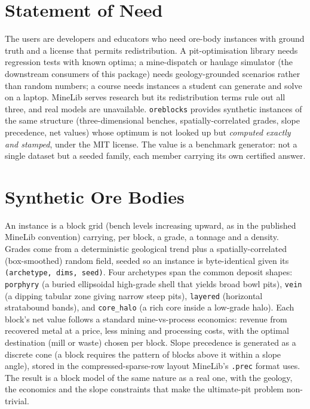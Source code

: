 \documentclass[journal]{IEEEtran}
\begin{document}
\section{Statement of Need}\label{sec:need}

The users are developers and educators who need ore-body instances with ground truth and a license that permits
redistribution. A pit-optimisation library needs regression tests with known optima; a mine-dispatch or haulage
simulator (the downstream consumers of this package) needs geology-grounded scenarios rather than random
numbers; a course needs instances a student can generate and solve on a laptop. MineLib serves research but its
redistribution terms rule out all three, and real models are unavailable. \texttt{oreblocks} provides synthetic
instances of the same structure (three-dimensional benches, spatially-correlated grades, slope precedence, net
values) whose optimum is not looked up but \emph{computed exactly and stamped}, under the MIT license. The value
is a benchmark generator: not a single dataset but a seeded family, each member carrying its own certified
answer.

\section{Synthetic Ore Bodies}\label{sec:deposits}

An instance is a block grid (bench levels increasing upward, as in the published MineLib convention) carrying,
per block, a grade, a tonnage and a density. Grades come from a deterministic geological trend plus a
spatially-correlated (box-smoothed) random field, seeded so an instance is byte-identical given its
\texttt{(archetype, dims, seed)}. Four archetypes span the common deposit shapes: \texttt{porphyry} (a buried
ellipsoidal high-grade shell that yields broad bowl pits), \texttt{vein} (a dipping tabular zone giving narrow
steep pits), \texttt{layered} (horizontal stratabound bands), and \texttt{core\_halo} (a rich core inside a
low-grade halo). Each block's net value follows a standard mine-vs-process economics: revenue from recovered
metal at a price, less mining and processing costs, with the optimal destination (mill or waste) chosen per
block. Slope precedence is generated as a discrete cone (a block requires the pattern of blocks above it within a
slope angle), stored in the compressed-sparse-row layout MineLib's \texttt{.prec} format uses. The result is a
block model of the same nature as a real one, with the geology, the economics and the slope constraints that make
the ultimate-pit problem non-trivial.
\end{document}
